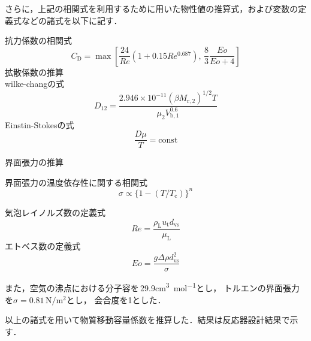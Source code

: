 \documentclass[a4j]{jsreport}
\begin{document}
さらに，上記の相関式を利用するために用いた物性値の推算式，および変数の定義式などの諸式を以下に記す．

\noindent 抗力係数の相関式\cite{19952357}
\begin{equation}
    C_\mathrm{D} = \max \left[ \frac{24}{Re}(1+0.15Re^{0.687}), \, \frac{8}{3} \frac{Eo}{Eo+4} \right]
\end{equation}
拡散係数の推算\\
wilke-changの式\cite{wilke}
\begin{equation}
    D_{12} = \frac{2.946\times 10^{-11}(\beta M_{\mathrm{r,2}})^{1/2} T} {\mu_2 V_{\mathrm{b},1}^{0.6}}
\end{equation}
Einstin-Stokesの式\cite{実験テキスト}
\begin{equation}
    \frac{D \mu}{T} = \text{const}
\end{equation}

\noindent 界面張力の推算

\noindent 界面張力の温度依存性に関する相関式\cite{化工便覧}
\begin{equation}
    \sigma \propto \{ 1-(T/T_\mathrm{c}) \}^n
\end{equation}

\noindent 気泡レイノルズ数の定義式\cite{19952357}
\begin{equation}
    Re = \frac{\rho_\mathrm{L}u_\mathrm{t} d_\mathrm{vs}}{\mu_\mathrm{L}}
\end{equation}
\noindent エトベス数の定義式\cite{19952357}
\begin{equation}
    Eo = \frac{g \varDelta \rho d_\mathrm{vs}^2}{\sigma}
\end{equation}

また，空気の沸点における分子容を\,29.9\si{\cubic \centi \metre \per \mole}とし\cite{化工便覧}，
トルエンの界面張力を$\sigma=0.81 \,\si{\newton \per \metre \squared}$とし\cite{界面張力}，
会合度を1とした\cite{TPP}．

以上の諸式を用いて物質移動容量係数を推算した．結果は反応器設計結果で示す．
\end{document}
